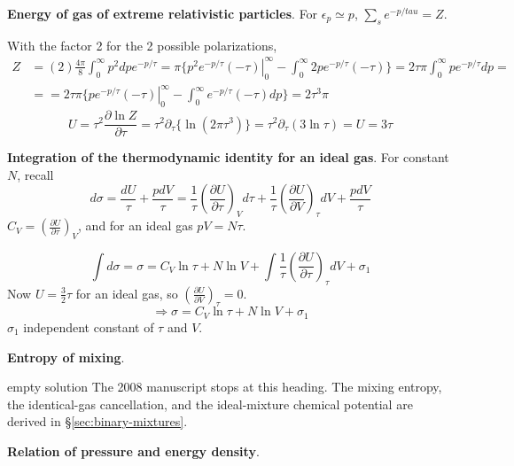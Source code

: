  \textbf{Energy of gas of extreme relativistic particles}.  For $\epsilon_p \simeq p$, $\sum_s e^{-p/tau} =Z$.  

With the factor 2 for the 2 possible polarizations,
\[
\begin{aligned}
Z & = (2) \frac{4\pi }{8} \int_0^{\infty} p^2 dp e^{-p/\tau} = \pi \lbrace  \left. p^2 e^{-p/\tau} (-\tau) \right|_0^{\infty} - \int_0^{\infty} 2 p e^{-p/\tau} (-\tau) \rbrace = 2 \tau \pi \int_0^{\infty} p e^{-p/\tau} dp = \\ 
& = = 2 \tau \pi \lbrace \left. p e^{-p/\tau} (-\tau) \right|_0^{\infty} - \int_0^{\infty} e^{-p/\tau} (-\tau) dp \rbrace = 2 \tau^3 \pi 
\end{aligned}
\]
\[
U =  \tau^2 \frac{ \partial \ln{Z} }{ \partial \tau} = \tau^2 \partial_{\tau} \lbrace \ln{ (2\pi \tau^3  )} \rbrace = \tau^2 \partial_{\tau} (3\ln{\tau}) = \boxed{ U = 3\tau }
\]




 \textbf{Integration of the thermodynamic identity for an ideal gas}.  For constant $N$, recall
\[
d\sigma = \frac{dU}{\tau} + \frac{ p dV}{\tau}  = \frac{1}{\tau} \left( \frac{ \partial U}{ \partial \tau} \right)_V d\tau + \frac{1}{\tau} \left( \frac{ \partial U}{ \partial V} \right)_{\tau} dV + \frac{p dV}{\tau}
\]
$C_V = \left( \frac{ \partial U}{ \partial \tau} \right)_V$, and for an ideal gas $pV = N\tau$.  

\[
\int d\sigma = \sigma = C_V \ln{\tau} + N \ln{V} + \int \frac{1}{\tau} \left( \frac{ \partial U}{ \partial \tau} \right)_{\tau} dV + \sigma_1
\]
Now $U = \frac{3}{2} \tau$ for an ideal gas, so $\left( \frac{\partial U}{\partial V}\right)_{\tau} =0$.  
\[
\Longrightarrow \sigma = C_V \ln{\tau} + N \ln{V} + \sigma_1 
\]
$\sigma_1$ independent constant of $\tau$ and $V$.  










 \textbf{Entropy of mixing}.
\begin{correction}{empty solution}
The 2008 manuscript stops at this heading.
The mixing entropy, the identical-gas cancellation, and the ideal-mixture chemical potential are derived in \S\ref{sec:binary-mixtures}.
\end{correction}   







 \textbf{Relation of pressure and energy density}.  

